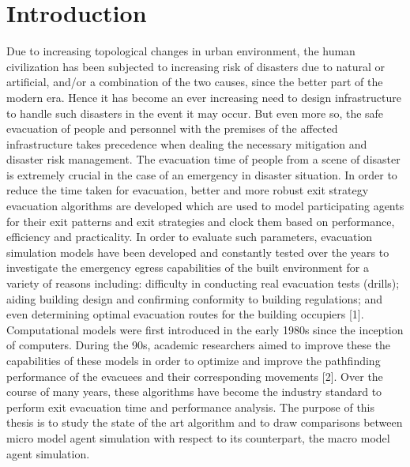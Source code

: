 
\chapter{Introduction\label{ch:intro}}

Due to increasing topological changes in urban environment, the human civilization has been subjected to increasing risk of disasters due to natural or artificial, and/or a combination of the two causes, since the better part of the modern era. Hence it has become an ever increasing need to design infrastructure to handle such disasters in the event it may occur. But even more so, the safe evacuation of people and personnel with the premises of the affected infrastructure takes precedence when dealing the necessary mitigation and disaster risk management. The evacuation time of people from a scene of disaster is extremely crucial in the case of an emergency in disaster situation. In order to reduce the time taken for evacuation, better and more robust exit strategy evacuation algorithms are developed which are used to model participating agents for their exit patterns and exit strategies and clock them based on performance, efficiency and practicality. In order to evaluate such parameters, evacuation simulation models have been developed and constantly tested over the years to investigate the emergency egress capabilities of the built environment for a variety of reasons including: difficulty in conducting real evacuation tests (drills); aiding building design and confirming conformity to building regulations; and even determining optimal evacuation routes for the building occupiers [1]. Computational models were first introduced in the early 1980s since the inception of computers. During the 90s, academic researchers aimed to improve these the capabilities of these models in order to optimize and improve the pathfinding performance of the evacuees and their corresponding movements [2]. Over the course of many years, these algorithms have become the industry standard to perform exit evacuation time and performance analysis. The purpose of this thesis is to study the state of the art algorithm and to draw comparisons between micro model agent simulation with respect to its counterpart, the macro model agent simulation.


